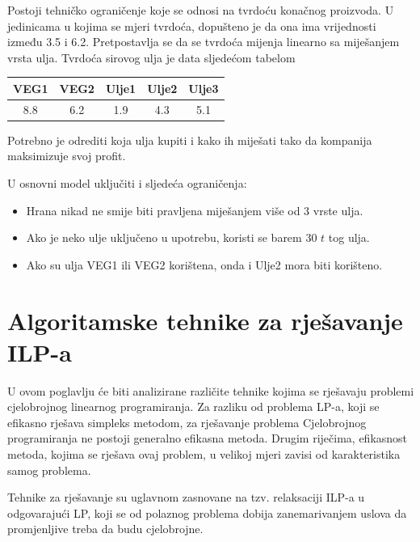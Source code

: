 \documentclass[a4paper, utf8, 11pt, colorlinks]{book}
\theoremstyle{definition}
\begin{document}
\begin{enumerate}
Postoji tehničko ograničenje koje se odnosi na tvrdoću konačnog proizvoda. U jedinicama u kojima se mjeri tvrdoća, dopušteno je da ona ima vrijednosti između 3.5 i 6.2. Pretpostavlja se da se tvrdoća mijenja %
 linearno sa miješanjem vrsta ulja. Tvrdoća sirovog ulja je data sljedećom tabelom
\begin{table}[H]
	\centering
	\begin{tabular}{ccccc}
		    VEG1 & VEG2 & Ulje1 & Ulje2 & Ulje3 \\ \hline
		    8.8  & 6.2  & 1.9   & 4.3   & 5.1   \\
    \end{tabular} 
\end{table}

Potrebno je odrediti koja ulja kupiti i kako ih miješati  tako da kompanija maksimizuje svoj profit. 

U osnovni model uključiti i sljedeća ograničenja:
\begin{itemize}
	\item Hrana nikad ne smije biti  pravljena miješanjem više od 3 vrste ulja. 
	\item Ako je neko ulje uključeno u upotrebu,  koristi se barem 30 $t$ tog ulja.
	\item Ako su ulja VEG1 ili VEG2  korištena, onda i Ulje2 mora biti korišteno.  
\end{itemize}

\end{enumerate}                                                       


 \chapter{Algoritamske tehnike za rješavanje ILP-a}\label{chap:rjesavanjeILP}
 
 U ovom poglavlju će biti analizirane različite tehnike kojima se rješavaju problemi cjelobrojnog linearnog programiranja.
 Za razliku od problema LP-a, koji se efikasno rješava simpleks metodom, za rješavanje problema Cjelobrojnog programiranja ne postoji generalno efikasna metoda. Drugim riječima, efikasnost metoda, kojima se rješava ovaj problem, u velikoj mjeri zavisi od karakteristika samog problema. 
 
 
 
Tehnike za rješavanje su uglavnom zasnovane na tzv. relaksaciji ILP-a u odgovarajući LP, koji se od polaznog problema dobija zanemarivanjem uslova da promjenljive treba da budu cjelobrojne. 
\end{document}
